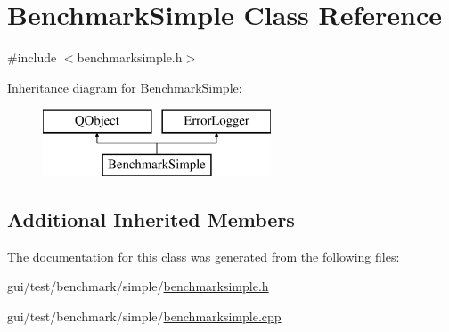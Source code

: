 \hypertarget{class_benchmark_simple}{\section{Benchmark\-Simple Class Reference}
\label{class_benchmark_simple}
}


{\ttfamily \#include $<$benchmarksimple.\-h$>$}

Inheritance diagram for Benchmark\-Simple\-:\begin{figure}[H]
\begin{center}
\leavevmode
\includegraphics[height=2.000000cm]{class_benchmark_simple}
\end{center}
\end{figure}
\subsection*{Additional Inherited Members}


The documentation for this class was generated from the following files\-:\begin{DoxyCompactItemize}
\item 
gui/test/benchmark/simple/\hyperlink{benchmarksimple_8h}{benchmarksimple.\-h}\item 
gui/test/benchmark/simple/\hyperlink{benchmarksimple_8cpp}{benchmarksimple.\-cpp}\end{DoxyCompactItemize}
